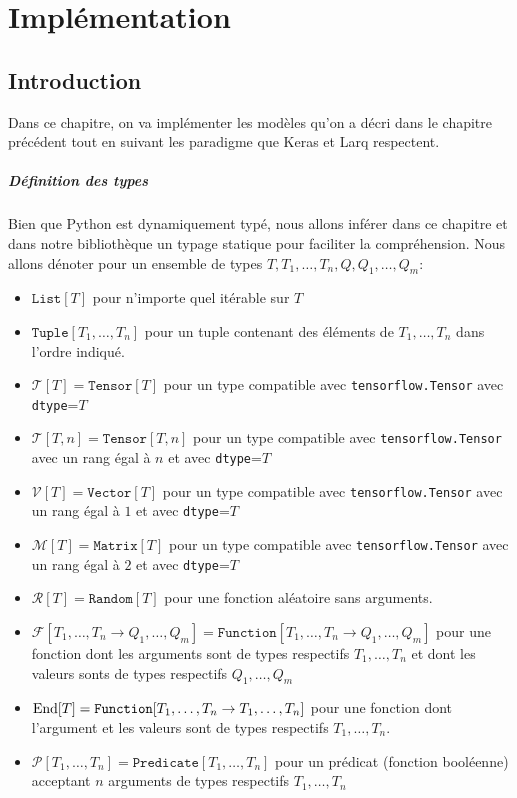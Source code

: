 \chapter{Implémentation}

\section{Introduction}

Dans ce chapitre, on va implémenter les modèles qu'on a décri dans le chapitre précédent tout en suivant les paradigme que Keras et Larq respectent.
\paragraph{Définition des types}
Bien que Python est dynamiquement typé, nous allons inférer dans ce chapitre et dans notre bibliothèque un typage statique pour faciliter la compréhension.
\newline Nous allons dénoter pour un ensemble de types $T,T_1,\dots,T_n,Q,Q_1,\dots,Q_m$:
\begin{itemize}
	\item $\texttt{List}[T]$ pour n'importe quel itérable sur $T$
	\item $\texttt{Tuple}[T_1,\dots,T_n]$ pour un tuple contenant  des éléments de $T_1,\dots,T_n$ dans l'ordre indiqué.
	\item $\mathcal{T}[T]=\texttt{Tensor}[T]$  pour un type compatible avec 	\texttt{tensorflow.Tensor} avec \texttt{dtype}=$T$
	\item $\mathcal{T}[T,n]=\texttt{Tensor}[T,n]$  pour un type compatible avec 	\texttt{tensorflow.Tensor} avec un rang égal à $n$ et avec \texttt{dtype}=$T$
	\item $\mathcal{V}[T]=\texttt{Vector}[T]$ pour un type compatible avec 	\texttt{tensorflow.Tensor} avec un rang égal à $1$ et avec \texttt{dtype}=$T$
	\item $\mathcal{M}[T]=\texttt{Matrix}[T]$  pour un type compatible avec 	\texttt{tensorflow.Tensor} avec un rang égal à $2$ et avec \texttt{dtype}=$T$
	\item $\mathcal{R}[T]=\texttt{Random}[T]$ pour une fonction aléatoire sans arguments.
	\item $\mathcal{F}[T_1,\dots,T_n\rightarrow Q_1,\dots,Q_m]=\texttt{Function}[T_1,\dots,T_n\rightarrow Q_1,\dots,Q_m]$ pour une fonction dont les arguments sont de types respectifs $T_1,\dots,T_n$ et dont les valeurs sonts de types respectifs $Q_1,\dots,Q_m$
	\item $\operatorname{End}[T]=\texttt{Function}[T_1,\dots,T_n\rightarrow T_1,\dots,T_n]$ pour une fonction dont l'argument et les valeurs sont de types respectifs $T_1,\dots,T_n$. 
	\item $\mathcal{P}[T_1,\dots,T_n]=\texttt{Predicate}[T_1,\dots,T_n]$ pour un prédicat (fonction booléenne)  acceptant $n$ arguments de types respectifs $T_1,\dots,T_n$
\end{itemize}
\newpage
